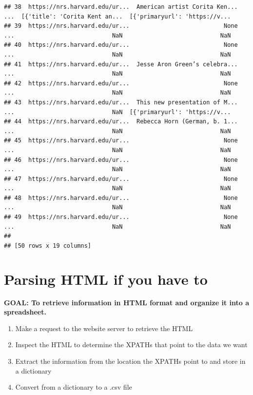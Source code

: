 \documentclass[]{book}
\providecommand{\tightlist}{%
  \setlength{\itemsep}{0pt}\setlength{\parskip}{0pt}}
\begin{document}
\begin{verbatim}
## 38  https://nrs.harvard.edu/ur...  American artist Corita Ken...  ...  [{'title': 'Corita Kent an...  [{'primaryurl': 'https://v...
## 39  https://nrs.harvard.edu/ur...                           None  ...                            NaN                            NaN
## 40  https://nrs.harvard.edu/ur...                           None  ...                            NaN                            NaN
## 41  https://nrs.harvard.edu/ur...  Jesse Aron Green’s celebra...  ...                            NaN                            NaN
## 42  https://nrs.harvard.edu/ur...                           None  ...                            NaN                            NaN
## 43  https://nrs.harvard.edu/ur...  This new presentation of M...  ...                            NaN  [{'primaryurl': 'https://v...
## 44  https://nrs.harvard.edu/ur...  Rebecca Horn (German, b. 1...  ...                            NaN                            NaN
## 45  https://nrs.harvard.edu/ur...                           None  ...                            NaN                            NaN
## 46  https://nrs.harvard.edu/ur...                           None  ...                            NaN                            NaN
## 47  https://nrs.harvard.edu/ur...                           None  ...                            NaN                            NaN
## 48  https://nrs.harvard.edu/ur...                           None  ...                            NaN                            NaN
## 49  https://nrs.harvard.edu/ur...                           None  ...                            NaN                            NaN
## 
## [50 rows x 19 columns]
\end{verbatim}

\hypertarget{parsing-html-if-you-have-to}{%
\section{Parsing HTML if you have to}\label{parsing-html-if-you-have-to}}

\textbf{GOAL: To retrieve information in HTML format and organize it into a spreadsheet.}

\begin{enumerate}
\def\labelenumi{\arabic{enumi}.}
\tightlist
\item
  Make a request to the website server to retrieve the HTML
\item
  Inspect the HTML to determine the XPATHs that point to the data we want
\item
  Extract the information from the location the XPATHs point to and store in a dictionary
\item
  Convert from a dictionary to a .csv file
\end{enumerate}
\end{document}
